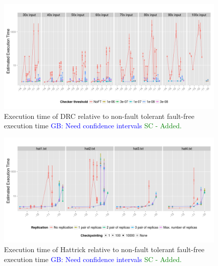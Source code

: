 \documentclass{sig-alternate}
\newcommand{\sui}[1]{%
  \textcolor{green}{SC - #1}
}
\newcommand{\greg}[1]{%
  \textcolor{blue}{GB: #1}
}
\begin{document}
\begin{figure}[ht!]
\centering
\includegraphics[width=2.00\columnwidth]{figs/DRC_EstdCost.png}
\vspace{-10pt}
\caption{Execution time of DRC relative to non-fault tolerant fault-free execution time \greg{Need confidence intervals} \sui{Added.}}
\vspace{-10pt}
\label{fig:DRC_EstdCost}
\end{figure}

\begin{figure}[ht!]
\centering
\includegraphics[width=2.00\columnwidth]{figs/Hattrick_EstdCost.png}
\vspace{-10pt}
\caption{Execution time of Hattrick relative to non-fault tolerant fault-free execution time \greg{Need confidence intervals} \sui{Added.}}
\vspace{-10pt}
\label{fig:Hattrick_EstdCost}
\end{figure}


\end{document}
